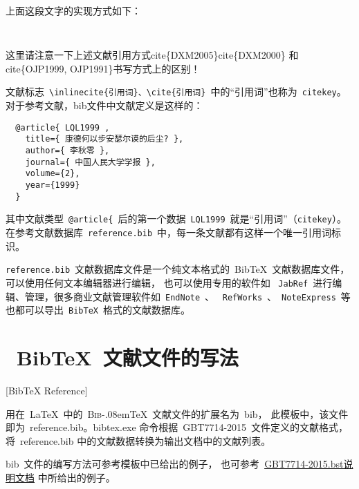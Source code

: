 上面这段文字的实现方式如下：

\texttt{
}

这里请注意一下上述文献引用方式\cite{DXM2005}\cite{DXM2000}\cs cite\{DXM2005\}\cs cite\{DXM2000\}
和\cite{OJP1999,OJP1991}\cs cite\{OJP1999, OJP1991\}书写方式上的区别！

文献标志~\verb|\inlinecite{引用词}、\cite{引用词}|~中的“引用词”也称为~\verb|citekey|。
对于参考文献，bib文件中文献定义是这样的：
\begin{lstlisting}
  @article{ LQL1999 ,
    title={ 康德何以步安瑟尔谟的后尘? },
    author={ 李秋零 },
    journal={ 中国人民大学学报 },
    volume={2},
    year={1999}
  }
\end{lstlisting}

其中文献类型~\verb|@article{|~后的第一个数据~\verb|LQL1999|~就是“引用词”（\verb|citekey|）。
在参考文献数据库~\texttt{reference.bib}~中，每一条文献都有这样一个唯一引用词标识。

\texttt{reference.bib}~文献数据库文件是一个纯文本格式的~BibTeX~文献数据库文件，可以使用任何文本编辑器进行编辑，
也可以使用专用的软件如 ~\texttt{JabRef}~进行编辑、管理，很多商业文献管理软件如~\texttt{EndNote}~、
~\texttt{RefWorks}~、~\texttt{NoteExpress}~等也都可以导出~\texttt{BibTeX}~格式的文献数据库。

\section{~BibTeX~文献文件的写法}[BibTeX Reference]

用在~\LaTeX~中的~\textsc{Bib}\kern-.08em\TeX~文献文件的扩展名为~bib，
此模板中，该文件即为~reference.bib。bibtex.exe 命令根据~GBT7714-2015~文件定义的文献格式，
将~reference.bib 中的文献数据转换为输出文档中的文献列表。

bib~文件的编写方法可参考模板中已给出的例子，
也可参考~\href{http://bbs.ctex.org/attachment.php?aid=MTk3OTd8NjY1ODc5OGV8MTMyNTY0MTEyMnxhZGZkYWpsa0I2RGZwNDR5Z1lyeStjb1dKRS8rTnJub3lvT2FkNDNJbHl1UWVkVQ\%3D\%3D}{GBT7714-2015.bst说明文档} 中所给出的例子。


